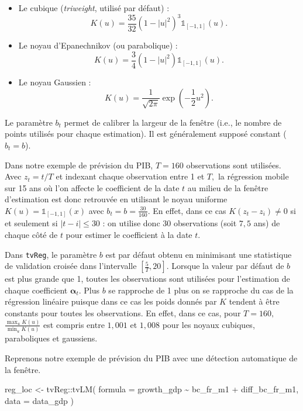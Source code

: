 \documentclass[
  a4paper,
  DIV=11,
  numbers=noendperiod,
  french]{scrartcl}
\newenvironment{Shaded}{\begin{snugshade}}{\end{snugshade}}
\newcommand{\AttributeTok}[1]{\textcolor[rgb]{0.40,0.45,0.13}{#1}}
\newcommand{\FunctionTok}[1]{\textcolor[rgb]{0.28,0.35,0.67}{#1}}
\newcommand{\NormalTok}[1]{\textcolor[rgb]{0.00,0.23,0.31}{#1}}
\newcommand{\OtherTok}[1]{\textcolor[rgb]{0.00,0.23,0.31}{#1}}
\newcommand{\SpecialCharTok}[1]{\textcolor[rgb]{0.37,0.37,0.37}{#1}}
\newcommand\1{{\mathds 1}}
\newcommand{\bf}[1]{{\boldsymbol #1}}
\theoremstyle{remark}
\begin{document}
\begin{itemize}
\item
  Le cubique (\emph{triweight}, utilisé par défaut) : \[
  K(u)=\frac{35}{32}\left(
  1-
  \left\lvert
  u
  \right\lvert^2
  \right)^3\1_{[-1,1]}(u).
  \]
\item
  Le noyau d'Epanechnikov (ou parabolique) : \[
  K(u)=\frac{3}{4}\left(
  1-
  \left\lvert
  u
  \right\lvert^2
  \right)\1_{[-1,1]}(u).
  \]
\item
  Le noyau Gaussien : \[
  K(u)=\frac{1}{\sqrt{2\pi}}\exp\left(-\frac{1}{2}u^2\right).
  \]
\end{itemize}

Le paramètre \(b_t\) permet de calibrer la largeur de la fenêtre (i.e.,
le nombre de points utilisés pour chaque estimation). Il est
généralement supposé constant (\(b_t=b\)).

Dans notre exemple de prévision du PIB, \(T=160\) observations sont
utilisées. Avec \(z_t=t/T\) et indexant chaque observation entre 1 et
\(T,\) la régression mobile sur 15 ans où l'on affecte le coefficient de
la date \(t\) au milieu de la fenêtre d'estimation est donc retrouvée en
utilisant le noyau uniforme \(K(u)=\1_{[-1,1]}(x)\) avec
\(b_t=b=\frac{30}{160}.\) En effet, dans ce cas \(K(z_t-z_i)\ne0\) si et
seulement si \(|t-i|\leq30\) : on utilise donc 30 observations (soit
\(7,5\) ans) de chaque côté de \(t\) pour estimer le coefficient à la
date \(t.\)

Dans \texttt{tvReg}, le paramètre \(b\) est par défaut obtenu en
minimisant une statistique de validation croisée dans l'intervalle
\(\left[\frac{5}{T},20\right].\) Lorsque la valeur par défaut de \(b\)
est plus grande que 1, toutes les observations sont utilisées pour
l'estimation de chaque coefficient \(\bf\alpha_t.\) Plus \(b\) se
rapproche de 1 plus on se rapproche du cas de la régression linéaire
puisque dans ce cas les poids donnés par \(K\) tendent à être constants
pour toutes les observations. En effet, dans ce cas, pour \(T=160,\)
\(\frac{\max_u K(u)}{\min_u K(u)}\) est compris entre \(1,001\) et
\(1,008\) pour les noyaux cubiques, paraboliques et gaussiens.

Reprenons notre exemple de prévision du PIB avec une détection
automatique de la fenêtre.

\begin{Shaded}
\begin{Highlighting}[]
\NormalTok{reg\_loc }\OtherTok{\textless{}{-}}\NormalTok{ tvReg}\SpecialCharTok{::}\FunctionTok{tvLM}\NormalTok{(}
  \AttributeTok{formula =}\NormalTok{ growth\_gdp }\SpecialCharTok{\textasciitilde{}}\NormalTok{ bc\_fr\_m1 }\SpecialCharTok{+}\NormalTok{ diff\_bc\_fr\_m1,}
  \AttributeTok{data =}\NormalTok{ data\_gdp}
\NormalTok{)}
\end{Highlighting}
\end{Shaded}
\end{document}
